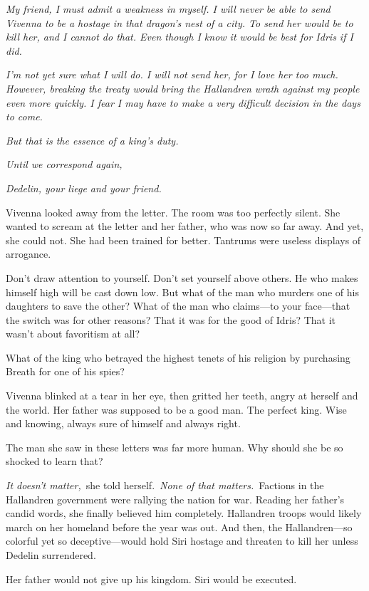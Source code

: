 \textit{My friend, I must admit a weakness in myself. I will never be able to send Vivenna to be a hostage in that dragon’s nest of a city. To send her would be to kill her, and I cannot do that. Even though I know it would be best for Idris if I did.}

\textit{I’m not yet sure what I will do. I will not send her, for I love her too much. However, breaking the treaty would bring the Hallandren wrath against my people even more quickly. I fear I may have to make a very difficult decision in the days to come.}

\textit{But that is the essence of a king’s duty.}

\textit{Until we correspond again,}

\textit{Dedelin, your liege and your friend.}

Vivenna looked away from the letter. The room was too perfectly silent. She wanted to scream at the letter and her father, who was now so far away. And yet, she could not. She had been trained for better. Tantrums were useless displays of arrogance.

Don’t draw attention to yourself. Don’t set yourself above others. He who makes himself high will be cast down low. But what of the man who murders one of his daughters to save the other? What of the man who claims—to your face—that the switch was for other reasons? That it was for the good of Idris? That it wasn’t about favoritism at all?

What of the king who betrayed the highest tenets of his religion by purchasing Breath for one of his spies?

Vivenna blinked at a tear in her eye, then gritted her teeth, angry at herself and the world. Her father was supposed to be a good man. The perfect king. Wise and knowing, always sure of himself and always right.

The man she saw in these letters was far more human. Why should she be so shocked to learn that?

\textit{It doesn’t matter,}~she told herself.~\textit{None of that matters.}~Factions in the Hallandren government were rallying the nation for war. Reading her father’s candid words, she finally believed him completely. Hallandren troops would likely march on her homeland before the year was out. And then, the Hallandren—so colorful yet so deceptive—would hold Siri hostage and threaten to kill her unless Dedelin surrendered.

Her father would not give up his kingdom. Siri would be executed.


